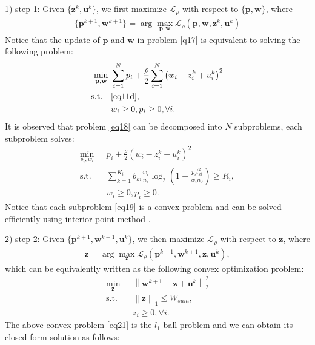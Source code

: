 \documentclass[journal]{IEEEtran}
\begin{document}
1) step 1: Given $\{\mathbf{z}^k, \mathbf{u}^k\}$, we first maximize $\mathcal{L}_\rho$ with respect to $\{\mathbf{p}, \mathbf{w}\}$, where
\begin{align}
\{\mathbf{p}^{k+1}, \mathbf{w}^{k+1}\} = \arg \max_{\mathbf{p}, \mathbf{w}} \mathcal{L}_\rho\left(\mathbf{p}, \mathbf{w}, \mathbf{z}^k, \mathbf{u}^k\right) \label{q17}
\end{align}
Notice that the update of $\mathbf{p}$ and $\mathbf{w}$ in problem \eqref{q17} is equivalent to solving the following problem:
\begin{subequations}\label{eq18}
	\begin{align}
	\min_{\mathbf{p}, \mathbf{w}}\ & \sum\limits_{i = 1}^{N} p_i + \frac{\rho}{2}\sum\limits_{i = 1}^{N}\left(w_i - z_i^k + u_i^k \right)^2  \label{eq18a} \\ \mbox{s.t.} \quad &  \eqref{eq11d},  \label{eq18b} \\
	& w_i\geq 0, p_i \geq 0, \forall i. \label{eq18c}
	\end{align}
\end{subequations}
It is observed that problem \eqref{eq18} can be decomposed into $N$ subproblems, each subproblem solves:
\begin{subequations}\label{eq19}
	\begin{align}
	\min_{p_i, w_i}\ & p_i + \frac{\rho}{2}\left(w_i - z_i^k + u_i^k \right)^2  \label{eq19a} \\ \mbox{s.t.} \quad & \sum\limits_{k = 1}^{K_i}b_{ki}\frac{w_i}{n_i}\log_2\left(1 + \frac{p_it_{ki}^2}{w_in_0}\right) \geq \bar{R}_i,  \label{eq19b} \\
	& w_i\geq 0, p_i \geq 0. \label{eq19c}
	\end{align}
\end{subequations}
Notice that each subproblem \eqref{eq19} is a convex problem and can be solved efficiently using interior point method \cite{SBoyd3}.

2) step 2: Given $\{\mathbf{p}^{k+1}, \mathbf{w}^{k+1}, \mathbf{u}^k\}$, we then maximize $\mathcal{L}_\rho$ with respect to $\mathbf{z}$, where
\begin{align}
\mathbf{z} = \arg \max_{\mathbf{z}} \mathcal{L}_\rho\left(\mathbf{p}^{k+1}, \mathbf{w}^{k+1}, \mathbf{z}, \mathbf{u}^k\right),
\end{align} 
which can be equivalently written as the following convex optimization problem: 
\begin{subequations}\label{eq21}
	\begin{align}
	\min_{\mathbf{z}}\ & \left\|\mathbf{w}^{k+1} - \mathbf{z} + \mathbf{u}^k \right\|_2^2 \label{eq21a} \\ \mbox{s.t.} \quad & \left\|\mathbf{z} \right\|_1 \leq W_{sum},  \label{eq21b} \\
	& z_i\geq 0, \forall i. \label{eq21c}
	\end{align}
\end{subequations}
The above convex problem \eqref{eq21} is the $l_1$ ball problem \cite{JDuchi} and we can obtain its closed-form solution as follows:
\end{document}
